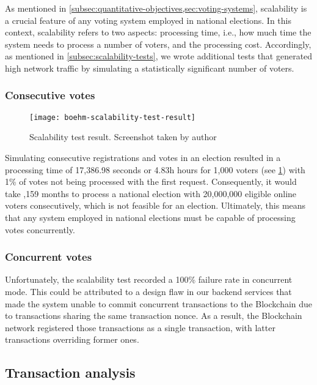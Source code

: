 As mentioned in \cref{subsec:quantitative-objectives,sec:voting-systems}, scalability is a crucial feature of any voting system employed in national elections.
In this context, scalability refers to two aspects: processing time, i.e., how much time the system needs to process a number of voters, and the processing cost.
Accordingly, as mentioned in \cref{subsec:scalability-tests}, we wrote additional tests that generated high network traffic by simulating a statistically significant number of voters.

\subsubsection{Consecutive votes}\label{subsubsec:res-consecutive-votes}

\begin{figure}[h]
    \centering
    \texttt{[image: boehm-scalability-test-result]}
    \caption[Scalability test result]{Scalability test result. Screenshot taken by author}
    \label{fig:scalability-test-result}
\end{figure}

Simulating consecutive registrations and votes in an election resulted in a processing time of 17,386.98 seconds or 4.83h hours for 1,000 voters (see \cref{fig:scalability-test-result}) with 1\% of votes not being processed with the first request.
Consequently, it would take ,159 months to process a national election with 20,000,000 eligible online voters consecutively, which is not feasible for an election.
Ultimately, this means that any system employed in national elections must be capable of processing votes concurrently.

\subsubsection{Concurrent votes}\label{subsubsec:res-concurrent-votes}

Unfortunately, the scalability test recorded a 100\% failure rate in concurrent mode.
This could be attributed to a design flaw in our backend services that made the system unable to commit concurrent transactions to the \gls{Blockchain} due to transactions sharing the same transaction nonce.
As a result, the \gls{Blockchain} network registered those transactions as a single transaction, with latter transactions overriding former ones.

\subsection{Transaction analysis}\label{subsec:res-transaction-analysis}

